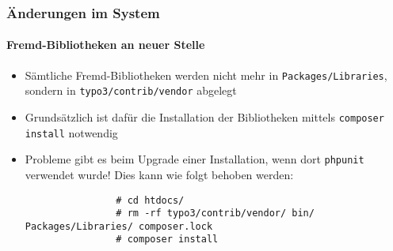 \begin{frame}[fragile]
	\frametitle{Änderungen im System}
	\framesubtitle{Fremd-Bibliotheken an neuer Stelle}

	\begin{itemize}
		\item Sämtliche Fremd-Bibliotheken werden nicht mehr in \texttt{Packages/Libraries},
			sondern in \texttt{typo3/contrib/vendor} abgelegt

		\item Grundsätzlich ist dafür die Installation der Bibliotheken mittels \texttt{composer install} notwendig

		\item Probleme gibt es beim Upgrade einer Installation, wenn dort \texttt{phpunit} verwendet wurde!
			Dies kann wie folgt behoben werden:
			\begin{lstlisting}
				# cd htdocs/
				# rm -rf typo3/contrib/vendor/ bin/ Packages/Libraries/ composer.lock
				# composer install
			\end{lstlisting}
	\end{itemize}

\end{frame}


